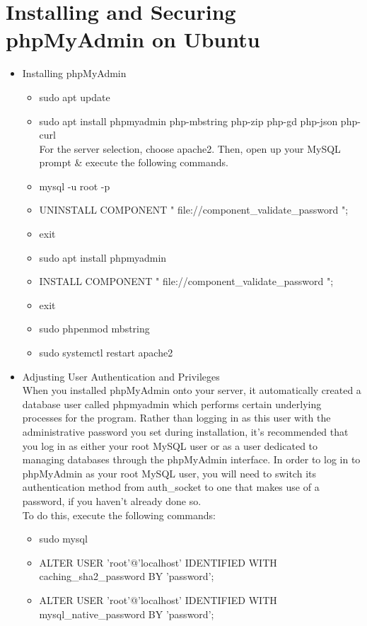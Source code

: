 \documentclass[10pt]{report}
\begin{document}
\section{Installing and Securing phpMyAdmin on Ubuntu}
\begin{itemize}
\item{Installing phpMyAdmin}
\begin{itemize}
\item{sudo apt update}
\item{sudo apt install phpmyadmin php-mbstring php-zip php-gd php-json php-curl} \\
For the server selection, choose apache2. Then, open up your MySQL prompt \& execute the following commands.
\item{mysql -u root -p}
\item{UNINSTALL COMPONENT " file://component\_validate\_password ";}
\item{exit}
\item{sudo apt install phpmyadmin}
\item{INSTALL COMPONENT " file://component\_validate\_password ";}
\item{exit}
\item{sudo phpenmod mbstring}
\item{sudo systemctl restart apache2}
\end{itemize}
\item{Adjusting User Authentication and Privileges} \\ 
When you installed phpMyAdmin onto your server, it automatically created a database user called phpmyadmin which performs certain underlying processes for the program. Rather than logging in as this user with the administrative password you set during installation, it’s recommended that you log in as either your root MySQL user or as a user dedicated to managing databases through the phpMyAdmin interface. In order to log in to phpMyAdmin as your root MySQL user, you will need to switch its
authentication method from auth\_socket to one that makes use of a password, if you haven’t already done so. \\ To do this, execute the following commands:
\begin{itemize}
\item{sudo mysql}
\item{
ALTER USER 'root'@'localhost' IDENTIFIED WITH caching\_sha2\_password BY 'password';}
\item{
ALTER USER 'root'@'localhost' IDENTIFIED WITH mysql\_native\_password BY 'password';} \\

\end{itemize}
\end{itemize}
\end{document}
